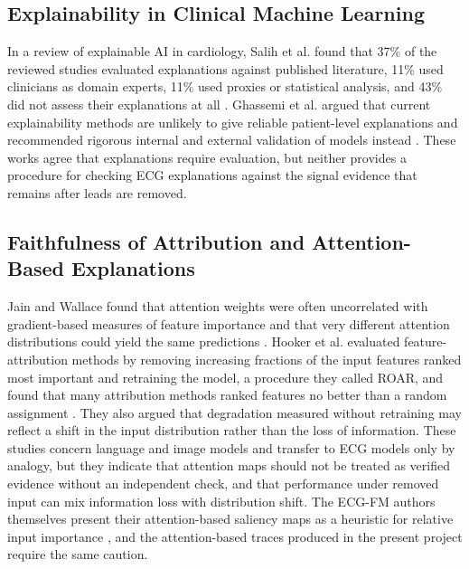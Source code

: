\subsection*{Explainability in Clinical Machine Learning}
In a review of explainable AI in cardiology, Salih et al. found that 37\% of the reviewed studies evaluated explanations against published literature, 11\% used clinicians as domain experts, 11\% used proxies or statistical analysis, and 43\% did not assess their explanations at all \cite{SALIH2024XAICARDIO}. Ghassemi et al. argued that current explainability methods are unlikely to give reliable patient-level explanations and recommended rigorous internal and external validation of models instead \cite{GHASSEMI2021FALSEHOPE}. These works agree that explanations require evaluation, but neither provides a procedure for checking ECG explanations against the signal evidence that remains after leads are removed.

\subsection*{Faithfulness of Attribution and Attention-Based Explanations}
Jain and Wallace found that attention weights were often uncorrelated with gradient-based measures of feature importance and that very different attention distributions could yield the same predictions \cite{JAIN2019ATTENTION}. Hooker et al. evaluated feature-attribution methods by removing increasing fractions of the input features ranked most important and retraining the model, a procedure they called ROAR, and found that many attribution methods ranked features no better than a random assignment \cite{HOOKER2019ROAR}. They also argued that degradation measured without retraining may reflect a shift in the input distribution rather than the loss of information. These studies concern language and image models and transfer to ECG models only by analogy, but they indicate that attention maps should not be treated as verified evidence without an independent check, and that performance under removed input can mix information loss with distribution shift. The ECG-FM authors themselves present their attention-based saliency maps as a heuristic for relative input importance \cite{MCKEEN2025ECGFM}, and the attention-based traces produced in the present project require the same caution.

